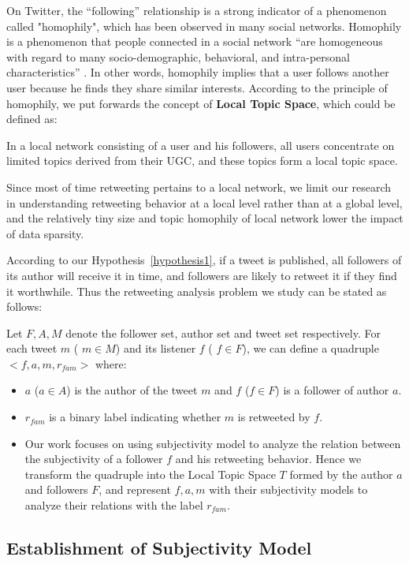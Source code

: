 \documentclass[twocolumn]{svjour3}          %
\begin{document}
On Twitter, the ``following'' relationship is a strong indicator of a phenomenon called "homophily", which has been observed in many social networks.
Homophily is a phenomenon that people connected in a social network ``are homogeneous with regard to many socio-demographic, behavioral, and intra-personal characteristics'' \cite{mcpherson2001birds}.
In other words, homophily implies that a user follows another user because he finds they share similar interests. 
According to the principle of homophily, we put forwards the concept of \textbf{Local Topic Space}, which could be defined as:
\begin{definition}
\label{LTS}
In a local network consisting of a user and his followers, all users concentrate on limited topics derived from their UGC, and these topics form a local topic space.
\end{definition}
Since most of time retweeting pertains to a local network, we limit our research in understanding retweeting behavior at a local level rather than at a global level, and the relatively tiny size and topic homophily of local network lower the impact of data sparsity.

According to our Hypothesis~\ref{hypothesis1}, if a tweet is published, all followers of its author will receive it in time, and followers are likely to retweet it if they find it worthwhile. 
Thus the retweeting analysis problem we study can be stated as follows:

Let $ F, A, M $ denote the follower set, author set and tweet set respectively. 
For each tweet $m$ ( $ m \in M $) and its listener $ f $ ( $ f \in F $), we can define a quadruple $ <f, a, m, r_{fam}>  $ where: 
\begin{itemize}
\item  $a$ ($a \in A $) is the author of the tweet $m$ and $f$ ($ f \in F $) is a follower of author $a$.
\item $ r_{fam} $ is a binary label indicating whether $ m $ is retweeted by $ f $.
\item Our work focuses on using subjectivity model to analyze the relation between the subjectivity of a follower $ f $ and his retweeting behavior. 
Hence we transform the quadruple into the Local Topic Space $ T $ formed by the author $ a $ and followers $F $, and represent $ f, a, m $ with their subjectivity models to analyze their relations with the label $ r_{fam} $.
\end{itemize}

\subsection{Establishment of Subjectivity Model }
\label{establish}
\end{document}
